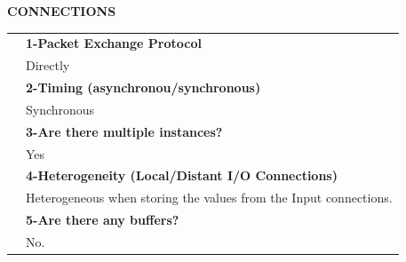 {\large\textbf{CONNECTIONS}}\vspace{10pt}\\\begin{tabular}{ p{0.2cm} p{14.5cm}}
	&\textbf{1-Packet Exchange Protocol}\\
	&Directly\vspace{7pt}\\
	&\textbf{2-Timing (asynchronou/synchronous)}\\
	&Synchronous\vspace{7pt}\\
	&\textbf{3-Are there multiple instances? }\\
	&Yes\vspace{7pt}\\
	&\textbf{4-Heterogeneity (Local/Distant I/O Connections)}\\
	&Heterogeneous when storing the values from the Input connections.\vspace{7pt}\\
	&\textbf{5-Are there any buffers?}\\
	&No.
\end{tabular}\vspace{14pt}\\

